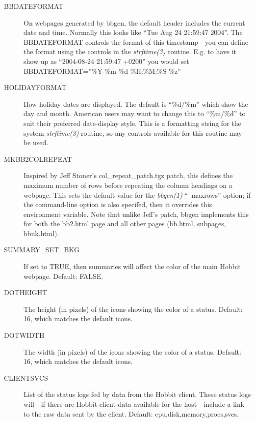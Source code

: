 \begin{description}
 

\item[BBDATEFORMAT] On webpages generated by bbgen, the default header includes the current date and time. Normally this looks like ``Tue Aug 24 21:59:47 2004''. The BBDATEFORMAT controls the format of this timestamp - you can define the format using the controls in the \emph{strftime(3)}
 routine. E.g. to have it show up as ``2004-08-24 21:59:47 +0200'' you would set BBDATEFORMAT=''\%Y-\%m-\%d \%H:\%M:\%S \%z'' 

 

\item[HOLIDAYFORMAT] How holiday dates are displayed. The default is ``\%d/\%m'' which show the day and month. American users may want to change this to ``\%m/\%d'' to suit their preferred date-display style. This is a formatting string for the system \emph{strftime(3)}
 routine, so any controls available for this routine may be used. 

 

\item[MKBB2COLREPEAT] Inspired by Jeff Stoner's col\_repeat\_patch.tgz patch, this defines the maximum number of rows before repeating the column headings on a webpage. This sets the default value for the \emph{bbgen(1)}
 ``--maxrows'' option; if the command-line option is also specifed, then it overrides this environment variable. Note that unlike Jeff's patch, bbgen implements this for both the bb2.html page and all other pages (bb.html, subpages, bbnk.html). 

 

\item[SUMMARY\_SET\_BKG] If set to TRUE, then summaries will affect the color of the main Hobbit webpage. Default: FALSE. 

 

\item[DOTHEIGHT] The height (in pixels) of the icons showing the color of a status. Default: 16, which matches the default icons. 

 

\item[DOTWIDTH] The width (in pixels) of the icons showing the color of a status. Default: 16, which matches the default icons. 

 

\item[CLIENTSVCS] List of the status logs fed by data from the Hobbit client. These status logs will - if there are Hobbit client data available for the host - include a link to the raw data sent by the client. Default: cpu,disk,memory,procs,svcs. 


\end{description}

